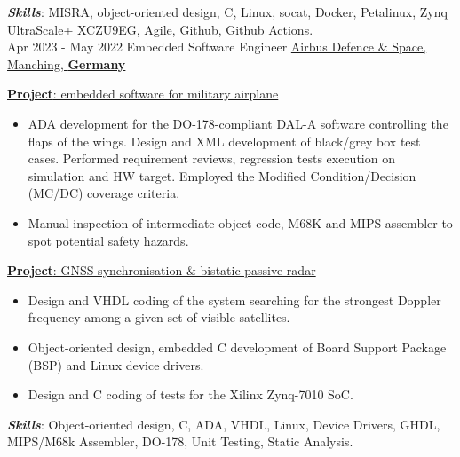 \documentclass[letterpaper]{twentysecondcv} %
\begin{document}
\begin{twenty}
{            \vspace{2 mm}
            \textbf{\textit{Skills}}: MISRA, object-oriented design, C, Linux, socat, Docker, Petalinux, Zynq UltraScale+ XCZU9EG, Agile, Github, Github Actions.
        }\\
    \twentyitem
        {Apr 2023 -}
        {May 2022}
        {Embedded Software Engineer}
        {\href{https://www.airbus.com/en/who-we-are}{Airbus Defence \& Space, Manching, \textbf{Germany}}}
        {}
        {
            \vspace{2 mm}
            \underline{\textbf{Project}: embedded software for military airplane}

            \vspace{2 mm}
            \begin{itemize}
                \item ADA development for the DO-178-compliant DAL-A software controlling the flaps of the wings. Design and XML development of black/grey box test cases. Performed requirement reviews, regression tests execution on simulation and HW target. Employed the Modified Condition/Decision (MC/DC) coverage criteria.
                \item Manual inspection of intermediate object code, M68K and MIPS assembler to spot potential safety hazards.
            \end{itemize}

            \vspace{2 mm}
            \underline{\textbf{Project}: GNSS synchronisation \& bistatic passive radar}

            \vspace{2 mm}
            \begin{itemize}
                \item Design and VHDL coding of the system searching for the strongest Doppler frequency among a given set of visible satellites.
                \item Object-oriented design, embedded C development of Board Support Package (BSP) and Linux device drivers.
                \item Design and C coding of tests for the Xilinx Zynq-7010 SoC.
            \end{itemize}

            \vspace{2 mm}
            \textbf{\textit{Skills}}: Object-oriented design, C, ADA, VHDL, Linux, Device Drivers, GHDL, MIPS/M68k Assembler, DO-178, Unit Testing, Static Analysis.
        }
\end{twenty}
\end{document}
